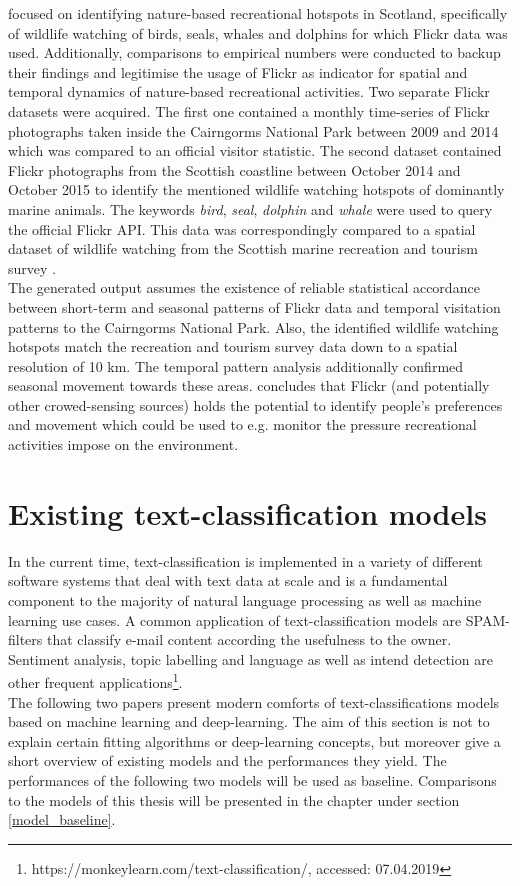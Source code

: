 \textcite{Mancini2018} focused on identifying nature-based recreational hotspots in Scotland, specifically of wildlife watching of birds, seals, whales and dolphins for which Flickr data was used. Additionally, comparisons to empirical numbers were conducted to backup their findings and legitimise the usage of Flickr as indicator for spatial and temporal dynamics of nature-based recreational activities.
Two separate Flickr datasets were acquired. The first one contained a monthly time-series of Flickr photographs taken inside the Cairngorms National Park between 2009 and 2014 which was compared to an official visitor statistic. The second dataset contained Flickr photographs from the Scottish coastline between October 2014 and October 2015 to identify the mentioned wildlife watching hotspots of dominantly marine animals. The keywords \textit{bird}, \textit{seal}, \textit{dolphin} and \textit{whale} were used to query the official Flickr API. This data was correspondingly compared to a spatial dataset of wildlife watching from the Scottish marine recreation and tourism survey \parencite{LUC2016}. \\
The generated output assumes the existence of reliable statistical accordance between short-term and seasonal patterns of Flickr data and temporal visitation patterns to the Cairngorms National Park.  
Also, the identified wildlife watching hotspots match the recreation and tourism survey data down to a spatial resolution of 10 km. The temporal pattern analysis additionally confirmed seasonal movement towards these areas. \textcite{Mancini2018} concludes that Flickr (and potentially other crowed-sensing sources) holds the potential to identify people's preferences and movement which could be used to e.g. monitor the pressure recreational activities impose on the environment.

\section{Existing text-classification models}\label{existing_text_class_models}
In the current time, text-classification is implemented in a variety of different software systems that deal with text data at scale and is a fundamental component to the majority of natural language processing as well as machine learning use cases. A common application of text-classification models are SPAM-filters that classify e-mail content according the usefulness to the owner. Sentiment analysis, topic labelling and language as well as intend detection are other frequent applications\footnote{https://monkeylearn.com/text-classification/, accessed: 07.04.2019}.\\
The following two papers present modern comforts of text-classifications models based on machine learning and deep-learning. The aim of this section is not to explain certain fitting algorithms or deep-learning concepts, but moreover give a short overview of existing models and the performances they yield. The performances of the following two models will be used as baseline. Comparisons to the models of this thesis will be presented in the  chapter under section \ref{model_baseline}. \\

